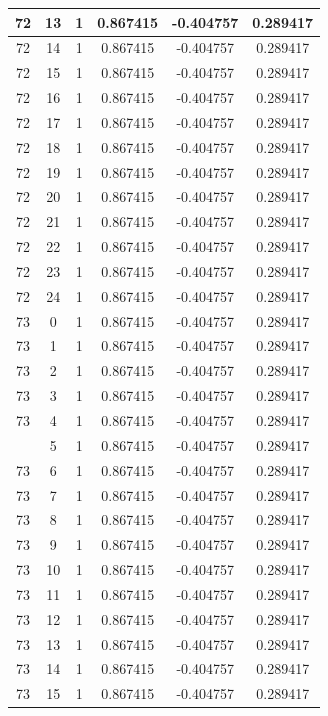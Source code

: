 \documentclass[12pt,a4paper]{article}
\numberwithin{equation}{section}
\numberwithin{figure}{section}
\numberwithin{table}{section}
\begin{document}
\begin{longtable}{|c|c|c|c|c|c|}
72 & 13 & 1 & 0.867415 & -0.404757 & 0.289417 \\ \hline
72 & 14 & 1 & 0.867415 & -0.404757 & 0.289417 \\ \hline
72 & 15 & 1 & 0.867415 & -0.404757 & 0.289417 \\ \hline
72 & 16 & 1 & 0.867415 & -0.404757 & 0.289417 \\ \hline
72 & 17 & 1 & 0.867415 & -0.404757 & 0.289417 \\ \hline
72 & 18 & 1 & 0.867415 & -0.404757 & 0.289417 \\ \hline
72 & 19 & 1 & 0.867415 & -0.404757 & 0.289417 \\ \hline
72 & 20 & 1 & 0.867415 & -0.404757 & 0.289417 \\ \hline
72 & 21 & 1 & 0.867415 & -0.404757 & 0.289417 \\ \hline
72 & 22 & 1 & 0.867415 & -0.404757 & 0.289417 \\ \hline
72 & 23 & 1 & 0.867415 & -0.404757 & 0.289417 \\ \hline
72 & 24 & 1 & 0.867415 & -0.404757 & 0.289417 \\ \hline
73 & 0 & 1 & 0.867415 & -0.404757 & 0.289417 \\ \hline
73 & 1 & 1 & 0.867415 & -0.404757 & 0.289417 \\ \hline
73 & 2 & 1 & 0.867415 & -0.404757 & 0.289417 \\ \hline
73 & 3 & 1 & 0.867415 & -0.404757 & 0.289417 \\ \hline
73 & 4 & 1 & 0.867415 & -0.404757 & 0.289417 \\ \hline
\pagebreak
73 & 5 & 1 & 0.867415 & -0.404757 & 0.289417 \\ \hline
73 & 6 & 1 & 0.867415 & -0.404757 & 0.289417 \\ \hline
73 & 7 & 1 & 0.867415 & -0.404757 & 0.289417 \\ \hline
73 & 8 & 1 & 0.867415 & -0.404757 & 0.289417 \\ \hline
73 & 9 & 1 & 0.867415 & -0.404757 & 0.289417 \\ \hline
73 & 10 & 1 & 0.867415 & -0.404757 & 0.289417 \\ \hline
73 & 11 & 1 & 0.867415 & -0.404757 & 0.289417 \\ \hline
73 & 12 & 1 & 0.867415 & -0.404757 & 0.289417 \\ \hline
73 & 13 & 1 & 0.867415 & -0.404757 & 0.289417 \\ \hline
73 & 14 & 1 & 0.867415 & -0.404757 & 0.289417 \\ \hline
73 & 15 & 1 & 0.867415 & -0.404757 & 0.289417 \\ \hline

\end{longtable}
\end{document}
